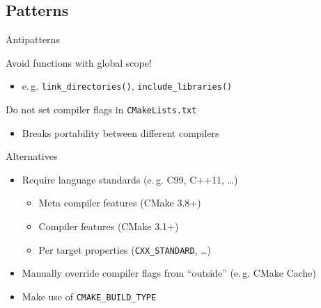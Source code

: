 \documentclass[t]{beamer}
\begin{document}
\subsection{Patterns}

\begin{frame}{Antipatterns}
    \begin{alertblock}{Avoid functions with global scope!}
        \begin{itemize}
            \item e.\,g. \texttt{link\_directories()},
                \texttt{include\_libraries()}
        \end{itemize}
    \end{alertblock}

    \pause

    \begin{alertblock}{Do not set compiler flags in \texttt{CMakeLists.txt}}
        \begin{itemize}
            \item Breaks portability between different compilers
        \end{itemize}
    \end{alertblock}

    \pause

    \begin{exampleblock}{Alternatives}
        \begin{itemize}
            \item Require language standards (e.\,g. C99, C++11, …)
                \begin{itemize}
                    \item Meta compiler features (CMake 3.8+)
                    \item Compiler features (CMake 3.1+)
                    \item Per target properties
                        (\texttt{CXX\_STANDARD}, …)
                \end{itemize}
            \item Manually override compiler flags from
                \enquote{outside} (e.\,g. CMake Cache)
            \item Make use of \texttt{CMAKE\_BUILD\_TYPE}
        \end{itemize}
    \end{exampleblock}
\end{frame}
\end{document}
